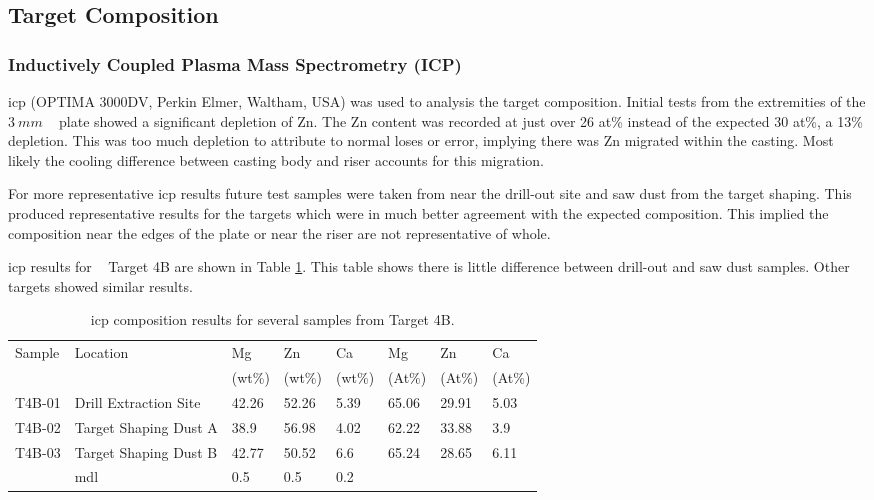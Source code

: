 \documentclass[a4paper,12pt,oneside]{report}%
\begin{document}
\subsection{Target Composition}

\subsubsection{Inductively Coupled Plasma Mass Spectrometry (ICP)}
\label{sec:TargetICP}

\Gls{icp} (OPTIMA 3000DV, Perkin Elmer, Waltham, USA) was used to analysis the target composition. Initial tests from the extremities of the $3~ mm$ \MgZnCa~ plate showed a significant depletion of Zn. The Zn content was recorded at just over 26 at\% instead of the expected 30 at\%, a 13\% depletion. This was too much depletion to attribute to normal loses or error, implying there was Zn migrated within the casting. Most likely the cooling difference between casting body and riser accounts for this migration. 

For more representative \gls{icp} results future test samples were taken from near the drill-out site and saw dust from the target shaping. This produced representative results for the targets which were in much better agreement with the expected composition. This implied the composition near the edges of the plate or near the riser are not representative of whole. 

\Gls{icp} results for \MgZnCa~ Target 4B are shown in Table \ref{tab:ICPT4B}. This table shows there is little difference between drill-out and saw dust samples. Other targets showed similar results.

\begin{table}[H]
	\centering
	\begin{tabular}{l l l l l l l l}
		\toprule
		Sample & Location & Mg & Zn & Ca & Mg & Zn & Ca \\ 
		& & (wt\%) & (wt\%) & (wt\%) & (At\%) & (At\%) & (At\%) \\ 
		\midrule
		T4B-01 & Drill Extraction Site & 42.26 & 52.26 & 5.39 & 65.06 & 29.91 & 5.03 \\ 
		T4B-02 & Target Shaping Dust A & 38.9 & 56.98 & 4.02 & 62.22 & 33.88 & 3.9 \\
		T4B-03 & Target Shaping Dust B & 42.77 & 50.52 & 6.6 & 65.24 & 28.65 & 6.11 \\
		\midrule
		& \acrshort{mdl} & 0.5 & 0.5 & 0.2 &  &  &  \\
		\bottomrule
	\end{tabular}
	\caption{\acrshort{icp} composition results for several samples from Target 4B.}
	\label{tab:ICPT4B}
\end{table}
\end{document}
